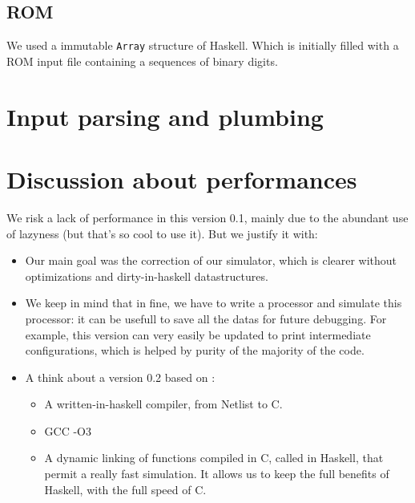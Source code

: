 \documentclass[a4paper, 11pt]{article}
\newcommand\co[1]{\texttt{#1}}
\begin{document}
\subsection{ROM}
We used a immutable \co{Array} structure of Haskell. Which is initially filled with a
ROM input file containing a sequences of binary digits. 

\section{Input parsing and plumbing}

\section{Discussion about performances}
We risk a lack of performance in this version 0.1, mainly due to the
abundant use of lazyness (but that's so cool to use it). But we 
justify it with:  
\begin{itemize} 
\item Our main goal was the correction of our simulator, which is clearer without
optimizations and dirty-in-haskell datastructures.
\item We keep in mind that
in fine, we have to write a processor and simulate this processor: it
can be usefull to save all the datas for future debugging. For example, this version
can very easily be updated to print intermediate configurations, which
is helped by purity of the majority of the code.   
\item A think about a version 0.2 based on :
\begin{itemize}
\item A written-in-haskell compiler, from Netlist to C.
\item GCC -O3
\item A dynamic linking of functions compiled in C, called in Haskell,
that permit a really fast simulation. It allows us to keep the full
benefits of 
Haskell, with the full speed of C.

\end{itemize}
\end{itemize}
\end{document}
